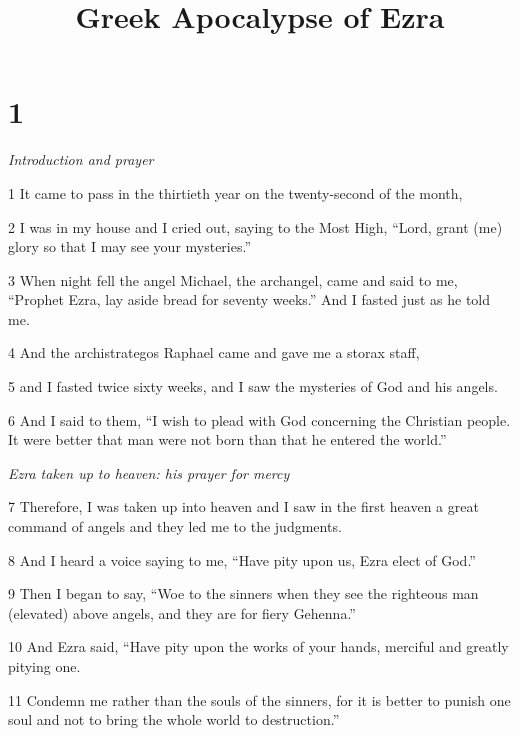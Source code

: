 

\title{Greek Apocalypse of Ezra}

\chapter{1}

\par \textit{Introduction and prayer}

\par 1 It came to pass in the thirtieth year on the twenty-second of the month, 

\par 2 I was in my house and I cried out, saying to the Most High, “Lord, grant (me) glory so that I may see your mysteries.”


\par 3 When night fell the angel Michael, the archangel, came and said to me, “Prophet Ezra, lay aside bread for seventy weeks.” And I fasted just as he told me.

\par 4 And the archistrategos Raphael came and gave me a storax staff, 

\par 5 and I fasted twice sixty weeks, and I saw the mysteries of God and his angels.

\par 6 And I said to them, “I wish to plead with God concerning the Christian people. It were better that man were not born than that he entered the world.”

\par \textit{Ezra taken up to heaven: his prayer for mercy}

\par 7 Therefore, I was taken up into heaven and I saw in the first heaven a great command of angels and they led me to the judgments.

\par 8 And I heard a voice saying to me, “Have pity upon us, Ezra elect of God.”

\par 9 Then I began to say, “Woe to the sinners when they see the righteous man (elevated) above angels, and they are for fiery Gehenna.”

\par 10 And Ezra said, “Have pity upon the works of your hands, merciful and greatly pitying one.

\par 11 Condemn me rather than the souls of the sinners, for it is better to punish one soul and not to bring the whole world to destruction.”

